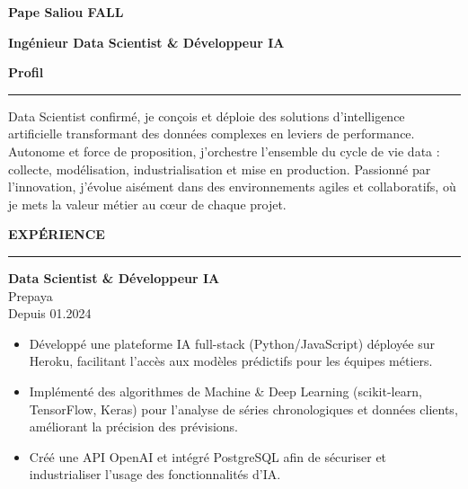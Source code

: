 \documentclass{article}
\newcommand{\cvsection}[1]{%
  \par\bigskip                %
  {\bfseries\Large #1}\par
  \noindent\rule{\linewidth}{0.8pt}\par
  \medskip                    %
}
\newcommand*{\ClipSep}{0.4cm}
\begin{document}
\pagestyle{empty}
\begin{paracol}{2}

\begin{minipage}{0.7\linewidth}
{\LARGE\textbf{Pape Saliou FALL}}

\bigskip
{\large\textbf{Ingénieur Data Scientist \& Développeur IA}}
\end{minipage}\hfill
\begin{minipage}{0.18\linewidth}
\end{minipage}

\cvsection{Profil}
Data Scientist confirmé, je conçois et déploie des solutions d’intelligence artificielle transformant des données complexes en leviers de performance. Autonome et force de proposition, j’orchestre l’ensemble du cycle de vie data : collecte, modélisation, industrialisation et mise en production. Passionné par l’innovation, j’évolue aisément dans des environnements agiles et collaboratifs, où je mets la valeur métier au cœur de chaque projet.

\cvsection{EXPÉRIENCE}

\colorbox{maincolor}{%
  \begin{minipage}{\linewidth}
    \textbf{Data Scientist \& Développeur IA} \\ Prepaya \\ Depuis 01.2024
    \begin{itemize}
      \item Développé une plateforme IA full-stack (Python/JavaScript) déployée sur Heroku, facilitant l’accès aux modèles prédictifs pour les équipes métiers. \item Implémenté des algorithmes de Machine \& Deep Learning (scikit-learn, TensorFlow, Keras) pour l’analyse de séries chronologiques et données clients, améliorant la précision des prévisions. \item Créé une API OpenAI et intégré PostgreSQL afin de sécuriser et industrialiser l’usage des fonctionnalités d’IA.
    \end{itemize}
  \end{minipage}}


\end{paracol}
\end{document}
